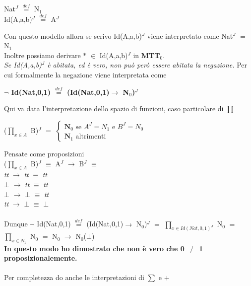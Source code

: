\begin{enumerate}
\begin{center}
Nat$^J$ ${\overset{\mathit{def}}{=}}$ N$_1$\\
Id(A,a,b)$^J$ ${\overset{\mathit{def}}{=}}$ A$^J$
\end{center}
\noindent
Con questo modello allora se scrivo Id(A,a,b)$^J$ viene interpretato come Nat$^J$ $=$ N$_1$\\
Inoltre possiamo derivare $\ast$ $\in$ Id(A,a,b)$^J$ in \textbf{MTT$_0$}.\\
\textit{Se Id(A,a,b)$^J$ \`e abitata, ed \`e vero, non pu\`o per\`o essere abitata la negazione.} Per cui formalmente la negazione viene interpretata come
\begin{center}\textbf{$\neg$ Id(Nat,0,1) ${\overset{\mathit{def}}{=}}$ (Id(Nat,0,1)$\rightarrow$ N$_0$)$^J$ }\end{center}
Qui va data l'interpretazione dello spazio di funzioni, caso particolare di {\scriptsize$\prod$}
\begin{center}
($\prod\limits_{x \in A}$ B)$^J$ $=$
$
\begin{cases}
\textbf{N}_0\text{ se } A^J =  N_1  \text{ e } B^J = N_0\\
\textbf{N}_1 \text{ altrimenti}
\end{cases}
$
\end{center}
\noindent
Pensate come proposizioni \\
($\prod\limits_{x \in A}$ B)$^J$ $\equiv$ A$^J$ $\rightarrow$ B$^J$ $\equiv$\\
\textit{tt} $\rightarrow$ \textit{tt} $\equiv$ \textit{tt}\\
$\bot$ $\rightarrow$ \textit{tt} $\equiv$ \textit{tt}\\
$\bot$ $\rightarrow$ $\bot$ $\equiv$ \textit{tt}\\
\textit{tt} $\rightarrow$ $\bot$ $\equiv$ $\bot$\\\\
\noindent
Dunque $\neg$ Id(Nat,0,1) ${\overset{\mathit{def}}{=}}$ (Id(Nat,0,1)$\rightarrow$ N$_0$)$^J$ $=$ $\prod\limits_{x \in Id(Nat,0,1)^J}$ N$_0$ $=$ $\prod\limits_{x \in N_1}$ N$_0$ $=$ N$_0$ $\rightarrow$ N$_0$($\bot$)\\
\textbf{In questo modo ho dimostrato che non \`e vero che 0 $\neq$ 1 proposizionalemente.}\\\\
\noindent
Per completezza do anche le interpretazioni di  {\scriptsize}$\sum$ e  $+$


\end{enumerate}
